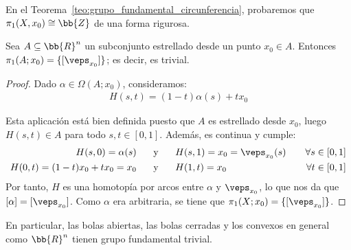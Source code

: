 \begin{ejemplo}
    En el Teorema~\ref{teo:grupo_fundamental_circunferencia}, probaremos que $\pi_1(X,x_0)\cong \bb{Z}$ de una forma rigurosa.
\end{ejemplo}

\begin{ejemplo}\label{ej:grupo_fundamental_estrellado}
    Sea $A\subseteq \bb{R}^n$ un subconjunto estrellado desde un punto $x_0\in A$. Entonces $\pi_1(A;x_0) = \{[\veps_{x_0}]\}$; es decir, es trivial.

    \begin{proof}
        Dado $\alpha\in \Omega(A; x_0)$, consideramos: 
        \begin{gather*}
            H(s,t) = (1-t)\alpha(s)+tx_0
        \end{gather*}

        Esta aplicación está bien definida puesto que $A$ es estrellado desde $x_0$, luego $H(s,t)\in A$ para todo $s,t\in [0,1]$. Además, es continua y cumple:
        \begin{align*}
            H(s,0) = \alpha(s) \hspace{0.5cm} &\text{ y } \hspace{0.5cm} H(s,1) = x_0 = \veps_{x_0}(s) \ \ \ &\forall s\in [0,1]\\
            H(0,t) = (1-t)x_0 + tx_0=x_0  \hspace{0.5cm} &\text{ y } \hspace{0.5cm} H(1,t) = x_0\ \ \ &\forall t \in [0,1]
        \end{align*}
        Por tanto, $H$ es una homotopía por arcos entre $\alpha$ y $\veps_{x_0}$, lo que nos da que $[\alpha] = [\veps_{x_0}]$. Como $\alpha$ era arbitraria, se tiene que $\pi_1(X;x_0) = \{[\veps_{x_0}]\}$.
    \end{proof}
    En particular, las bolas abiertas, las bolas cerradas y los convexos en general como $\bb{R}^n$ tienen grupo fundamental trivial.
\end{ejemplo}

